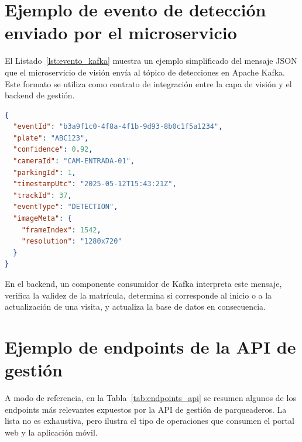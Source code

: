 \section{Ejemplo de evento de detección enviado por el microservicio}
\label{ap:evento_kafka}

El Listado~\ref{lst:evento_kafka} muestra un ejemplo simplificado del mensaje
JSON que el microservicio de visión envía al tópico de detecciones en Apache
Kafka. Este formato se utiliza como contrato de integración entre la capa de
visión y el backend de gestión.

\begin{lstlisting}[language=json,caption={Ejemplo de evento de detección publicado en Kafka.},label={lst:evento_kafka}]
{
  "eventId": "b3a9f1c0-4f8a-4f1b-9d93-8b0c1f5a1234",
  "plate": "ABC123",
  "confidence": 0.92,
  "cameraId": "CAM-ENTRADA-01",
  "parkingId": 1,
  "timestampUtc": "2025-05-12T15:43:21Z",
  "trackId": 37,
  "eventType": "DETECTION",
  "imageMeta": {
    "frameIndex": 1542,
    "resolution": "1280x720"
  }
}
\end{lstlisting}

En el backend, un componente consumidor de Kafka interpreta este mensaje,
verifica la validez de la matrícula, determina si corresponde al inicio o a
la actualización de una visita, y actualiza la base de datos en consecuencia.

\section{Ejemplo de endpoints de la API de gestión}
\label{ap:endpoints_api}

A modo de referencia, en la Tabla~\ref{tab:endpoints_api} se resumen algunos
de los endpoints más relevantes expuestos por la API de gestión de
parqueaderos. La lista no es exhaustiva, pero ilustra el tipo de operaciones
que consumen el portal web y la aplicación móvil.

